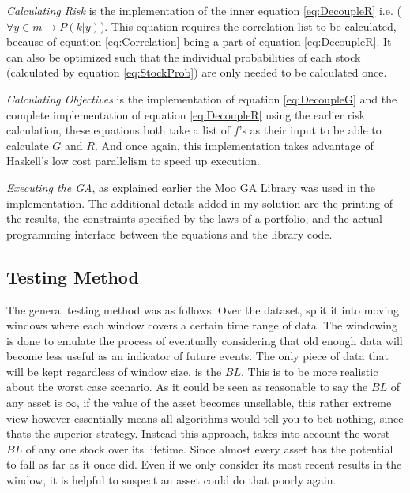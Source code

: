 \documentclass[11pt]{article}
\begin{document}
    \textit{Calculating Risk} is the implementation of the inner equation \ref{eq:DecoupleR} 
    i.e. (\(\forall y \in m \to P(k|y)\)). This equation
    requires the correlation list to be calculated, because of equation \ref{eq:Correlation} being a
    part of equation \ref{eq:DecoupleR}. It can also be optimized such that the individual
    probabilities of each stock (calculated by equation \ref{eq:StockProb}) are only needed to be
    calculated once.

    \textit{Calculating Objectives} is the implementation of equation \ref{eq:DecoupleG} and the complete
    implementation of equation \ref{eq:DecoupleR} using the earlier risk calculation, these
    equations both take a list of \(f\)'s as their input to be able to calculate \(G\) and \(R\).
    And once again, this implementation takes advantage of Haskell's low cost parallelism to speed
    up execution.

    \textit{Executing the GA}, as explained earlier the Moo GA Library \cite{Moo} was used in
    the implementation. The additional details added in my solution are the printing of the results,
    the constraints specified by the laws of a portfolio, and the actual programming interface
    between the equations and the library code.

\subsection{Testing Method}\label{section:TestingMethod}

    The general testing method was as follows. Over the dataset, split it into moving windows
    where each window covers a certain time range of data. The windowing is done to emulate
    the process of eventually considering that old enough data will become less useful
    as an indicator of future events. The only piece of data that will be kept regardless
    of window size, is the \(BL\). This is to be more realistic about the worst case scenario.
    As it could be seen as reasonable to say the \(BL\) of any asset is \(\infty\), if
    the value of the asset becomes unsellable, this rather extreme view however essentially means all
    algorithms would tell you to bet nothing, since thats the superior strategy. Instead
    this approach, takes into account the worst \(BL\) of any one stock over its lifetime.
    Since almost every asset has the potential to fall as far as it once did. Even if we only
    consider its most recent results in the window, it is helpful to suspect an asset could
    do that poorly again.
\end{document}
